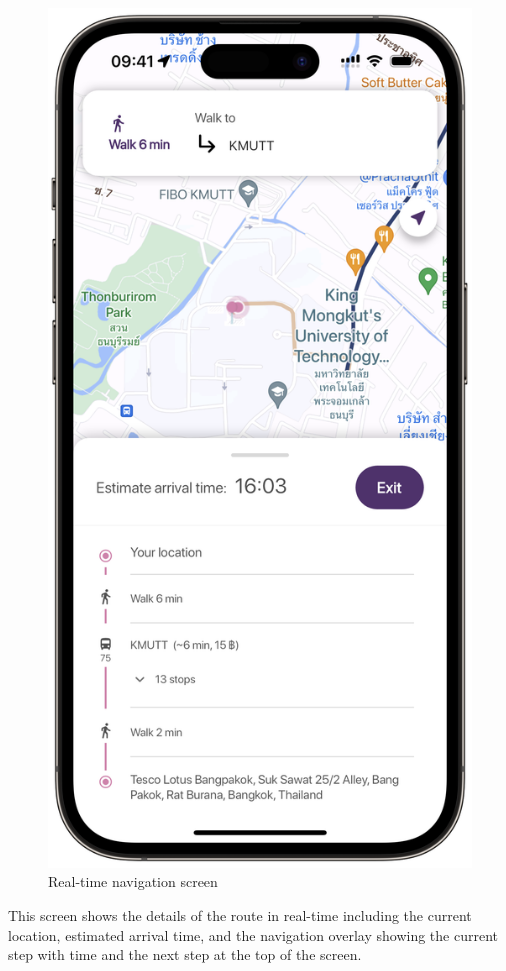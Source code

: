 \newpage
\begin{figure}[!h]
	\centering
	\includegraphics[width=0.5\linewidth]{chapter4/real_time_navigation_screen.png}
	\caption{Real-time navigation screen}
	\label{fig:Real-time navigation screen}
\end{figure}
This screen shows the details of the route in real-time including the current location, estimated arrival time, and the navigation overlay showing the current step with time and the next step at the top of the screen.

\newpage
